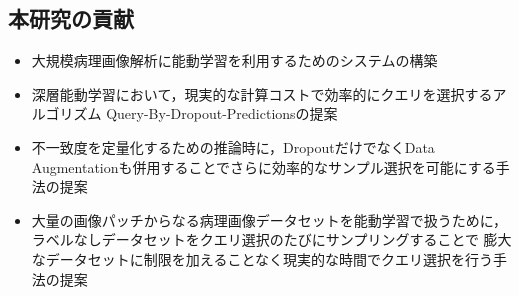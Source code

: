 \subsection{本研究の貢献}
\begin{itemize}
    \item 大規模病理画像解析に能動学習を利用するためのシステムの構築
    \item 深層能動学習において，現実的な計算コストで効率的にクエリを選択するアルゴリズム Query-By-Dropout-Predictionsの提案
    \item 不一致度を定量化するための推論時に，DropoutだけでなくData Augmentationも併用することでさらに効率的なサンプル選択を可能にする手法の提案
    \item 大量の画像パッチからなる病理画像データセットを能動学習で扱うために，ラベルなしデータセットをクエリ選択のたびにサンプリングすることで
    膨大なデータセットに制限を加えることなく現実的な時間でクエリ選択を行う手法の提案
\end{itemize}
